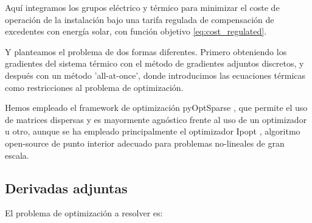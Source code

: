 Aquí integramos los grupos eléctrico y térmico para minimizar el coste de
operación de la instalación bajo una tarifa regulada de compensación de
excedentes con energía solar, con función objetivo \eqref{eq:cost_regulated}.

Y planteamos el problema de dos formas diferentes. Primero obteniendo los
gradientes del sistema térmico con el método de gradientes adjuntos discretos,
y después con un método 'all-at-once', donde introducimos las ecuaciones
térmicas como restricciones al problema de optimización.

Hemos empleado el framework de optimización pyOptSparse \cite{Wu2020}, que
permite el uso de matrices dispersas y es mayormente agnóstico frente al uso de
un optimizador u otro, aunque se ha empleado principalmente el optimizador
Ipopt \cite{wachter2006implementation}, algoritmo open-source de punto
interior adecuado para problemas no-lineales de gran escala.

\subsection{Derivadas adjuntas}

El problema de optimización a resolver es:

